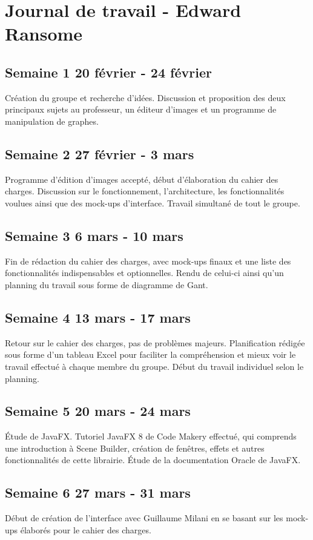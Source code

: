 \section{Journal de travail - Edward Ransome}

\subsection{Semaine 1 20 février - 24 février}
Création du groupe et recherche d'idées. Discussion et proposition des deux principaux sujets au professeur, un éditeur d'images et un programme de manipulation de graphes.
\subsection{Semaine 2 27 février - 3 mars}
Programme d'édition d'images accepté, début d'élaboration du cahier des charges. Discussion sur le fonctionnement, l'architecture, les fonctionnalités voulues ainsi que des mock-ups d'interface. Travail simultané de tout le groupe.
\subsection{Semaine 3 6 mars - 10 mars}
Fin de rédaction du cahier des charges, avec mock-ups finaux et une liste des fonctionnalités indispensables et optionnelles. Rendu de celui-ci ainsi qu'un planning du travail sous forme de diagramme de Gant.
\subsection{Semaine 4 13 mars - 17 mars}
Retour sur le cahier des charges, pas de problèmes majeurs. Planification rédigée sous forme d'un tableau Excel pour faciliter la compréhension et mieux voir le travail effectué à chaque membre du groupe. Début du travail individuel selon le planning. 
\subsection{Semaine 5 20 mars - 24 mars}
Étude de JavaFX. Tutoriel JavaFX 8 de Code Makery effectué, qui comprends une introduction à Scene Builder, création de fenêtres, effets et autres fonctionnalités de cette librairie. Étude de la documentation Oracle de JavaFX.
\subsection{Semaine 6 27 mars - 31 mars}
Début de création de l'interface avec Guillaume Milani en se basant sur les mock-ups élaborés pour le cahier des charges.
